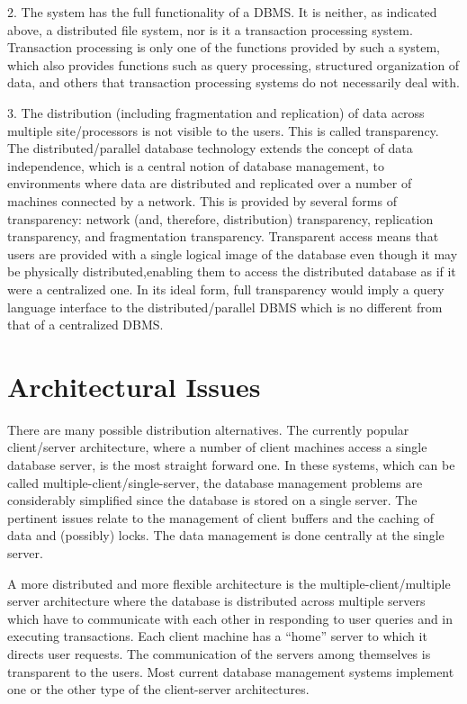 \documentclass{article}
\begin{document}
2. The system has the full functionality of a DBMS. It is neither, as indicated above, a distributed file system, nor is it a transaction processing system. Transaction processing is only one of the functions provided by such a system, which also provides functions such as query processing, structured organization of data, and others that transaction processing systems do not necessarily deal with.

3. The distribution (including fragmentation and replication) of data across multiple site/processors is not visible to the users. This is called transparency. The distributed/parallel database technology extends the concept of data independence, which is a central notion of database management, to
environments where data are distributed and replicated over a number of machines connected by a network. This is provided by several forms of transparency: network (and, therefore, distribution) transparency, replication transparency, and fragmentation transparency. Transparent access means that users are provided with a single logical image of the database even though it may be physically distributed,enabling them to access the distributed database as if it were a centralized one. In its ideal form, full transparency would imply a query language interface to the distributed/parallel DBMS which is no different from that of a centralized DBMS.

\section{Architectural Issues}
There are many possible distribution alternatives. The currently popular client/server architecture, where a number of client machines access a single database server, is the most straight forward one. In these systems, which can be called multiple-client/single-server, the database management
problems are considerably simplified since the database is stored on a single server. The pertinent issues relate to the management of client buffers and the caching of data and (possibly) locks. The data management is done centrally at the single server.

A more distributed and more flexible architecture is the multiple-client/multiple server architecture
where the database is distributed across multiple servers which have to communicate with each other in responding to user queries and in executing transactions. Each client machine has a “home” server to which it directs user requests. The communication of the servers among themselves is transparent to the users. Most current database management systems implement one or the other type of the client-server architectures.
\end{document}

